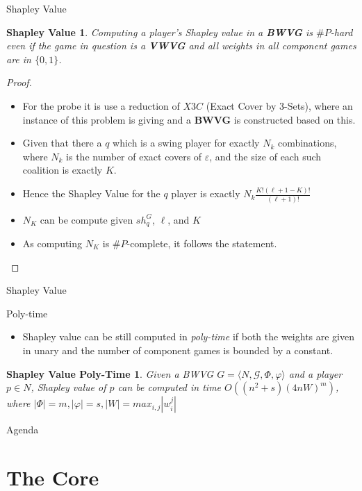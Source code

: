 \documentclass{beamer}
\begin{document}
\begin{frame}[fragile]{Shapley Value}
  \newtheorem{theorem4}{Shapley Value}
  \begin{theorem4}
    Computing a player's Shapley value in a \textbf{BWVG} is $\# P$-hard even if the game in question is a \textbf{VWVG}
    and all weights in all component games are in $\{0,1\}$.
  \end{theorem4}
  \begin{proof}
    \begin{itemize}
      \item For the probe it is use a reduction of $X3C$ (Exact Cover by 3-Sets), where an instance of this problem is giving and 
      a \textbf{BWVG} is constructed based on this.
      \item Given that there a $q$ which is a swing player for exactly $N_k$ combinations, where $N_k$ is the number of exact covers of $\varepsilon$,
      and the size of each such coalition is exactly $K$.
      \item Hence the Shapley Value for the $q$ player is exactly $N_k \frac{K!(\ell + 1 - K)!}{(\ell + 1)!}$
      \item $N_K$ can be compute given $sh_q^G$, $\ell$, and $K$
      \item As computing $N_K$ is $\# P$-complete, it follows the statement.
    \end{itemize}
  \end{proof}
\end{frame}

\begin{frame}[fragile]{Shapley Value}
  \begin{block}{Poly-time}
    \begin{itemize}
      \item Shapley value can be still computed in \textit{poly-time} if both the weights are given in unary and the number of component games 
      is bounded by a constant.
    \end{itemize}
  \end{block}
  \newtheorem{theorem5}{Shapley Value Poly-Time}
  \begin{theorem5}
    Given a BWVG $G = \langle N, \mathcal{G}, \Phi, \varphi \rangle$ and a player $p \in N$, Shapley value of $p$ can be computed in time $O((n^2 + s)(4nW)^m)$, where $|\Phi| = m, |\varphi| = s, |W| = max_{i,j}|w_i^j|$
  \end{theorem5}
\end{frame}

\begin{frame}[fragile]{Agenda}
  \section{The Core}
  \tableofcontents[currentsection]
\end{frame}
\end{document}
